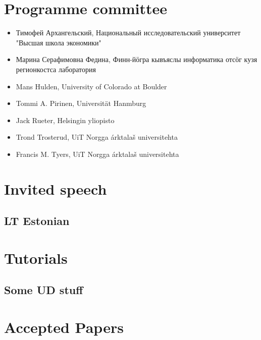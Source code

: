 \documentclass[b5paper]{book}
\newcommand\thedoi{doidoi}
\begin{document}
\renewcommand\thedoi{doidoi}

\chapter*{Programme committee}

\begin{itemize}
    \item Тимофей Архангельский, Национальный исследовательский университет "Высшая школа экономики"
    \item Марина Серафимовна Федина, Финн-йӧгра кывъяслы информатика отсӧг кузя регионкостса лаборатория
    \item Mans Hulden, University of Colorado at Boulder
    \item Tommi A. Pirinen, Universität Hanmburg
    \item Jack Rueter, Helsingin yliopisto
    \item Trond Trosterud, UiT Norgga árktalaš universitehta
    \item Francis M. Tyers, UiT Norgga árktalaš universitehta
\end{itemize}

\tableofcontents

\mainmatter

\chapter{Invited speech}
\section{LT Estonian}



\chapter{Tutorials}

\renewcommand\thedoi{doidoi}
\section{Some UD stuff}

\chapter{Accepted Papers}

\renewcommand\thedoi{doidoi}


\end{document}
